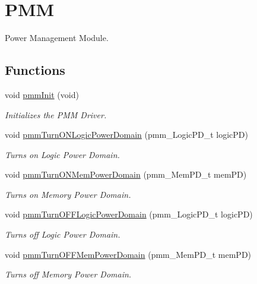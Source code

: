 \hypertarget{group__PMM}{}\section{P\+MM}
\label{group__PMM}


Power Management Module.  


\subsection*{Functions}
\begin{DoxyCompactItemize}
\item 
void \mbox{\hyperlink{group__PMM_ga677f111b8d9604b6ab733f58105a36d8}{pmm\+Init}} (void)
\begin{DoxyCompactList}\small\item\em Initializes the P\+MM Driver. \end{DoxyCompactList}\item 
void \mbox{\hyperlink{group__PMM_ga4caba5b694f4399bd0dc05030895d421}{pmm\+Turn\+O\+N\+Logic\+Power\+Domain}} (pmm\+\_\+\+Logic\+P\+D\+\_\+t logic\+PD)
\begin{DoxyCompactList}\small\item\em Turns on Logic Power Domain. \end{DoxyCompactList}\item 
void \mbox{\hyperlink{group__PMM_ga3395d248f6418becca238c5db150fc73}{pmm\+Turn\+O\+N\+Mem\+Power\+Domain}} (pmm\+\_\+\+Mem\+P\+D\+\_\+t mem\+PD)
\begin{DoxyCompactList}\small\item\em Turns on Memory Power Domain. \end{DoxyCompactList}\item 
void \mbox{\hyperlink{group__PMM_ga567bb1ec4293b6160bd70fa919c37a54}{pmm\+Turn\+O\+F\+F\+Logic\+Power\+Domain}} (pmm\+\_\+\+Logic\+P\+D\+\_\+t logic\+PD)
\begin{DoxyCompactList}\small\item\em Turns off Logic Power Domain. \end{DoxyCompactList}\item 
void \mbox{\hyperlink{group__PMM_ga962af2aa251e590f1adb4dd29019a508}{pmm\+Turn\+O\+F\+F\+Mem\+Power\+Domain}} (pmm\+\_\+\+Mem\+P\+D\+\_\+t mem\+PD)
\begin{DoxyCompactList}\small\item\em Turns off Memory Power Domain. \end{DoxyCompactList}\item 

\end{DoxyCompactItemize}
